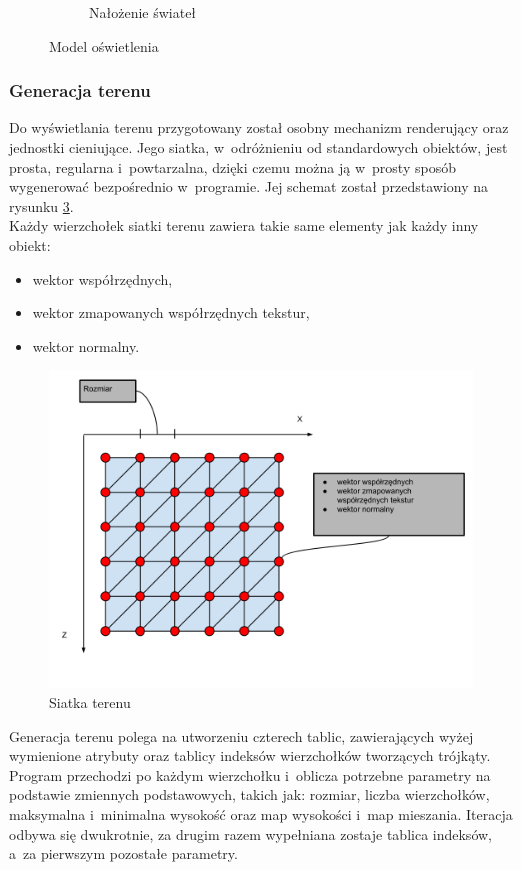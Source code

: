 \documentclass[a4paper,twoside,12pt]{book}
\begin{document}
\begin{figure}[H]
\begin{subfigure}[b]{0.5\textwidth}
        \caption{Nałożenie świateł}
        \label{fig:sum_lights}
    \end{subfigure}
    \caption{Model oświetlenia}
    \label{fig:sum_comparasion}
\end{figure}

\subsubsection{Generacja terenu}
Do wyświetlania terenu przygotowany został osobny mechanizm renderujący oraz jednostki cieniujące. Jego siatka, w~odróżnieniu od standardowych obiektów, jest prosta, regularna i~powtarzalna, dzięki czemu można ją w~prosty sposób wygenerować bezpośrednio w~programie. Jej schemat został przedstawiony na rysunku \ref{fig:terrain_grid}. \\
Każdy wierzchołek siatki terenu zawiera takie same elementy jak każdy inny obiekt:
\begin{itemize}
    \item wektor współrzędnych,
    \item wektor zmapowanych współrzędnych tekstur,
    \item wektor normalny.
\end{itemize}

\begin{figure}[H]
    \centering
    \includegraphics[width=\textwidth]{res/terrain_grid.png}
    \caption{Siatka terenu}
    \label{fig:terrain_grid}
\end{figure}

Generacja terenu polega na utworzeniu czterech tablic, zawierających wyżej wymienione atrybuty oraz tablicy indeksów wierzchołków tworzących trójkąty. Program przechodzi po każdym wierzchołku i~oblicza potrzebne parametry na podstawie zmiennych podstawowych, takich jak: rozmiar, liczba wierzchołków, maksymalna i~minimalna wysokość oraz map wysokości i~map mieszania. Iteracja odbywa się dwukrotnie, za drugim razem wypełniana zostaje tablica indeksów, a~za pierwszym pozostałe parametry. %
\end{document}
